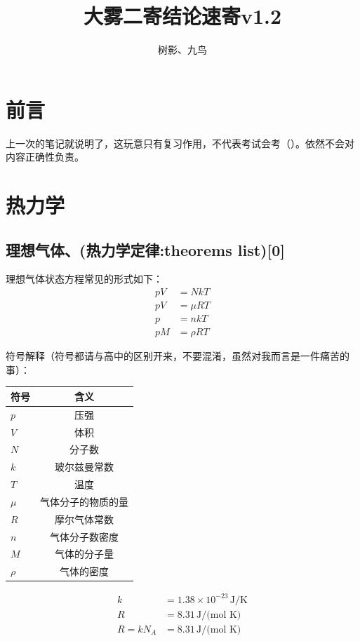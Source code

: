 \documentclass[10pt]{ctexart}
\author{树影、九鸟}
\title{大雾二寄结论速寄v1.2}
\date{}
\begin{document}
\maketitle
\section*{前言}

上一次的笔记就说明了，这玩意只有复习作用，不代表考试会考（）。依然不会对内容正确性负责。

\section{热力学}

\subsection{理想气体、(热力学定律:theorems list)[0]}

理想气体状态方程常见的形式如下：
\begin{align*}
    p V &= N k T \\
    p V &= \mu R T \\
    p &= n k T \\
    p M &= \rho R T
\end{align*}

符号解释（符号都请与高中的区别开来，不要混淆，虽然对我而言是一件痛苦的事）：

\begin{table}[H]
    \centering
    \begin{tabular}{l|c}
        符号 & 含义 \\
        \hline
        $p$ & 压强 \\
        $V$ & 体积 \\
        $N$ & 分子数 \\
        $k$ & 玻尔兹曼常数 \\
        $T$ & 温度 \\
        $\mu$ & 气体分子的物质的量 \\
        $R$ & 摩尔气体常数 \\
        $n$ & 气体分子数密度 \\
        $M$ & 气体的分子量 \\
        $\rho$ & 气体的密度
    \end{tabular}
\end{table}

\begin{align*}
    k &= 1.38 \times 10^{-23} \, \text{J/K} \\
    R &= 8.31 \, \text{J/(mol K)} \\
    R = k N_A &= 8.31 \, \text{J/(mol K)} \\
\end{align*}
\end{document}
